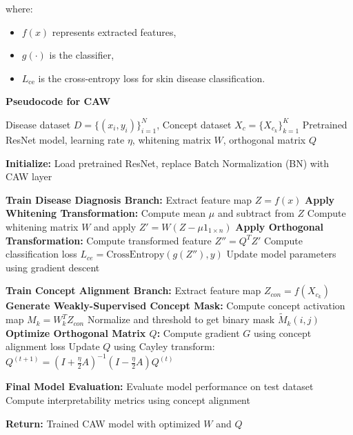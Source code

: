 \documentclass[a4paper,11pt]{article}
\begin{document}
where:
\begin{itemize}
    \item \( f(x) \) represents extracted features,
    \item \( g(\cdot) \) is the classifier,
    \item \( L_{\text{ce}} \) is the cross-entropy loss for skin disease classification.
\end{itemize}
    \caption{\textbf{Pseudocode for CAW}}
    \begin{algorithm}[h]
    \begin{algorithmic}[1]
        \Require Disease dataset \( D = \{(x_i, y_i)\}_{i=1}^{N} \), Concept dataset \( X_c = \{X_{c_k}\}_{k=1}^{K} \)
        \Require Pretrained ResNet model, learning rate \( \eta \), whitening matrix \( W \), orthogonal matrix \( Q \)

        \State \textbf{Initialize:} Load pretrained ResNet, replace Batch Normalization (BN) with CAW layer

        \State \textbf{Train Disease Diagnosis Branch:}
                \State Extract feature map \( Z = f(x) \)
                \State \textbf{Apply Whitening Transformation:} 
                \State \quad Compute mean \( \mu \) and subtract from \( Z \)
                \State \quad Compute whitening matrix \( W \) and apply \( Z' = W(Z - \mu 1_{1 \times n}) \)
                \State \textbf{Apply Orthogonal Transformation:}
                \State \quad Compute transformed feature \( Z'' = Q^T Z' \)
                \State Compute classification loss \( L_{ce} = \text{CrossEntropy}(g(Z''), y) \)
                \State Update model parameters using gradient descent
            \EndFor
        \EndFor

        \State \textbf{Train Concept Alignment Branch:}
                \State Extract feature map \( Z_{con} = f(X_{c_k}) \)
                \State \textbf{Generate Weakly-Supervised Concept Mask:}
                \State \quad Compute concept activation map \( M_k = W_k^T Z_{con} \)
                \State \quad Normalize and threshold to get binary mask \( \tilde{M}_k(i, j) \)
                \State \textbf{Optimize Orthogonal Matrix \( Q \):}
                \State \quad Compute gradient \( G \) using concept alignment loss
                \State \quad Update \( Q \) using Cayley transform:
                \State \quad \( Q^{(t+1)} = (I + \frac{\eta}{2} A)^{-1} (I - \frac{\eta}{2} A) Q^{(t)} \)
            \EndFor
        \EndFor

        \State \textbf{Final Model Evaluation:}
        \State Evaluate model performance on test dataset
        \State Compute interpretability metrics using concept alignment

        \State \textbf{Return:} Trained CAW model with optimized \( W \) and \( Q \)
    \end{algorithmic}
\end{algorithm}
\end{document}
